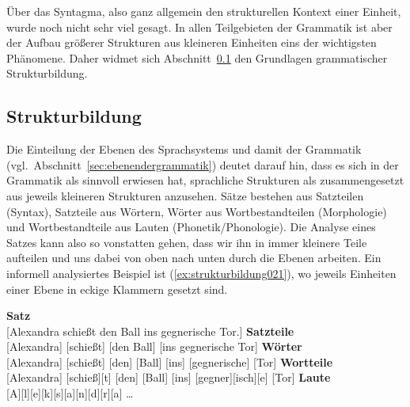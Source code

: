 
Über das Syntagma, also ganz allgemein den strukturellen Kontext einer Einheit, wurde noch nicht sehr viel gesagt.
In allen Teilgebieten der Grammatik ist aber der Aufbau größerer Strukturen aus kleineren Einheiten eins der wichtigsten Phänomene.
Daher widmet sich Abschnitt~\ref{sec:strukturbildung} den Grundlagen grammatischer Strukturbildung.

\subsection{Strukturbildung}
\label{sec:strukturbildung}

Die Einteilung der Ebenen des Sprachsystems und damit der Grammatik (vgl.\ Abschnitt~\ref{sec:ebenendergrammatik}) deutet darauf hin, dass es sich in der Grammatik als sinnvoll erwiesen hat, sprachliche Strukturen als zusammengesetzt aus jeweils kleineren Strukturen anzusehen.
Sätze bestehen aus Satzteilen (Syntax), Satzteile aus Wörtern, Wörter aus Wortbestandteilen (Morphologie) und Wortbestandteile aus Lauten (Phonetik\slash Phonologie).
Die Analyse eines Satzes kann also so vonstatten gehen, dass wir ihn in immer kleinere Teile aufteilen und uns dabei von oben nach unten durch die Ebenen arbeiten.
Ein informell analysiertes Beispiel ist (\ref{ex:strukturbildung021}), wo jeweils Einheiten einer Ebene in eckige Klammern gesetzt sind.

\begin{exe}
  \ex\label{ex:strukturbildung021}
  \begin{xlist}
    \ex \textbf{Satz} \\
    {[Alexandra schießt den Ball ins gegnerische Tor.]}
    \ex \textbf{Satzteile} \\
    {[Alexandra] [schießt] [den Ball] [ins gegnerische Tor]}
    \ex \textbf{Wörter} \\
    {[Alexandra] [schießt] [den] [Ball] [ins] [gegnerische] [Tor]}
    \ex \textbf{Wortteile} \\
    {[Alexandra] [schieß][t] [den] [Ball] [ins] [gegner][isch][e] [Tor]}
    \ex \textbf{Laute} \\
    {[A][l][e][k][s][a][n][d][r][a] \ldots \\}
  \end{xlist}
\end{exe}

